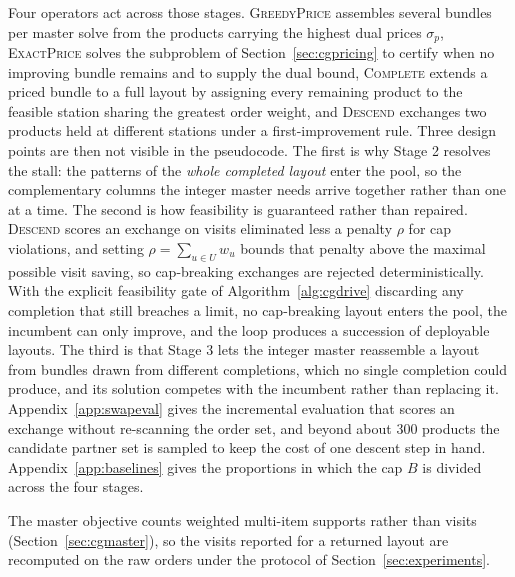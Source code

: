 \documentclass[]{interact}
\begin{document}
Four operators act across those stages. \textsc{GreedyPrice} assembles several bundles per master solve from the products carrying the highest dual prices $\sigma_p$, \textsc{ExactPrice} solves the subproblem of Section~\ref{sec:cgpricing} to certify when no improving bundle remains and to supply the dual bound, \textsc{Complete} extends a priced bundle to a full layout by assigning every remaining product to the feasible station sharing the greatest order weight, and \textsc{Descend} exchanges two products held at different stations under a first-improvement rule. Three design points are then not visible in the pseudocode. The first is why Stage 2 resolves the stall: the patterns of the \emph{whole completed layout} enter the pool, so the complementary columns the integer master needs arrive together rather than one at a time. The second is how feasibility is guaranteed rather than repaired. \textsc{Descend} scores an exchange on visits eliminated less a penalty $\rho$ for cap violations, and setting $\rho = \sum_{u \in U} w_u$ bounds that penalty above the maximal possible visit saving, so cap-breaking exchanges are rejected deterministically. With the explicit feasibility gate of Algorithm~\ref{alg:cgdrive} discarding any completion that still breaches a limit, no cap-breaking layout enters the pool, the incumbent can only improve, and the loop produces a succession of deployable layouts. The third is that Stage 3 lets the integer master reassemble a layout from bundles drawn from different completions, which no single completion could produce, and its solution competes with the incumbent rather than replacing it. Appendix~\ref{app:swapeval} gives the incremental evaluation that scores an exchange without re-scanning the order set, and beyond about 300 products the candidate partner set is sampled to keep the cost of one descent step in hand. Appendix~\ref{app:baselines} gives the proportions in which the cap $B$ is divided across the four stages.

The master objective counts weighted multi-item supports rather than visits (Section~\ref{sec:cgmaster}), so the visits reported for a returned layout are recomputed on the raw orders under the protocol of Section~\ref{sec:experiments}.
\end{document}
